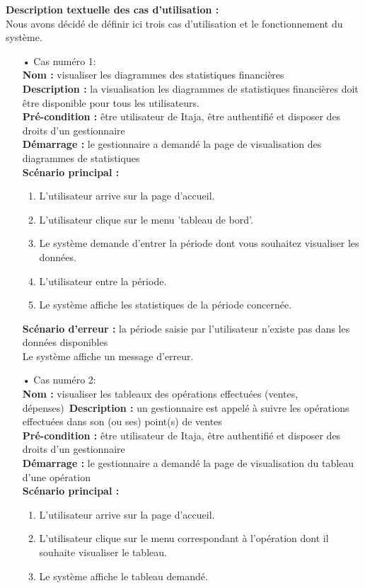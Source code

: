 \documentclass[12pt]{report}
\begin{document}
	  \textbf{Description textuelle des cas d'utilisation :}\\
	  Nous avons décidé de définir ici trois cas d'utilisation et le fonctionnement du système.
	  \begin{enumerate}
	    \item[•] Cas numéro 1:\\
	      \textbf{Nom :} visualiser les diagrammes des statistiques financières\\
	      \textbf{Description :} la visualisation les diagrammes de statistiques financières doit être disponible pour tous les utilisateurs.\\ 
	      \textbf{Pré-condition :} être utilisateur de Itaja, être authentifié et disposer des droits d'un gestionnaire\\
	      \textbf{Démarrage :} le gestionnaire a demandé la page de visualisation des diagrammes de statistiques\\
	      \textbf{Scénario principal :}
	      \begin{enumerate}
		\item L'utilisateur arrive sur la page d'accueil.
		\item L'utilisateur clique sur le menu 'tableau de bord'.
		\item Le système demande d'entrer la période dont vous souhaitez visualiser les données.
		\item L'utilisateur entre la période.
		\item Le système affiche les statistiques de la période concernée.
	      \end{enumerate}
	     \textbf{Scénario d'erreur :} la période saisie par l'utilisateur n'existe pas dans les données disponibles\\
		Le système affiche un message d'erreur.
	      
	    \item[•] Cas numéro 2:\\
	      \textbf{Nom :} visualiser les tableaux des opérations effectuées (ventes, dépenses)\
		\textbf{Description :} un gestionnaire est appelé à suivre les opérations effectuées dans son (ou ses) point(s) de ventes\\ 
		\textbf{Pré-condition :} être utilisateur de Itaja, être authentifié et disposer des droits d'un gestionnaire\\
		\textbf{Démarrage :} le gestionnaire a demandé la page de visualisation du tableau d'une opération\\
		\textbf{Scénario principal :}
		\begin{enumerate}
		  \item L'utilisateur arrive sur la page d'accueil.
		  \item L'utilisateur clique sur le menu correspondant à l'opération dont il souhaite visualiser le tableau.
		  \item Le système affiche le tableau demandé.
		\end{enumerate}
		

\end{enumerate}
\end{document}
